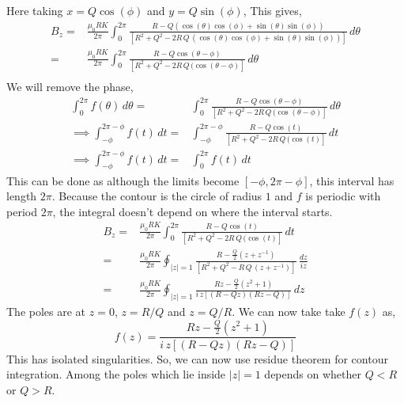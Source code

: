 \documentclass{article}
\begin{document}
Here taking $x=Q\cos(\phi)$ and $y = Q\sin(\phi)$, This gives,
\begin{equation*}
    \begin{split}
        B_z =& \frac{\mu_0 R K}{2\pi}\int_0^{2\pi}\frac{R-Q(\cos(\theta)\cos(\phi)+\sin(\theta)\sin(\phi))}{[R^2+Q^2-2R\, Q\, (\cos(\theta)\cos(\phi)+\sin(\theta)\sin(\phi))]}\, d\theta\\
        =& \frac{\mu_0 R K}{2\pi}\int_0^{2\pi}\frac{R-Q\cos(\theta-\phi)}{[R^2+Q^2-2R\, Q\, (\cos(\theta-\phi)]}\, d\theta\\
    \end{split}
\end{equation*}
We will remove the phase,
\begin{equation*}
    \begin{split}
        \int_{0}^{2\pi}f(\theta)\, d\theta =&\int_{0}^{2\pi}\frac{R-Q\cos(\theta-\phi)}{[R^2+Q^2-2R\, Q\, (\cos(\theta-\phi)]}\, d\theta\\
        \implies \int_{-\phi}^{2\pi-\phi}f(t)\, dt =& \int_{-\phi}^{2\pi-\phi}\frac{R-Q\cos(t)}{[R^2+Q^2-2R\, Q\, (\cos(t)]} \, dt\\
        \implies \int_{-\phi}^{2\pi-\phi}f(t)\, dt =& \int_{0}^{2\pi}f(t)\, dt
    \end{split}
\end{equation*}
This can be done as although the limits become $[-\phi, 2\pi-\phi]$, this interval has length $2\pi$. Because the contour is the circle of radius $1$ and $f$ is periodic with period $2\pi$, the integral doesn't depend on where the interval starts.
\begin{equation*}
    \begin{split}
        B_z =& \frac{\mu_0RK}{2\pi}\int_{0}^{2\pi}\frac{R-Q\cos(t)}{[R^2+Q^2-2R\, Q\, (\cos(t)]} \, dt\\
        =& \frac{\mu_0RK}{2\pi}\oint_{|z|=1}\frac{R-\frac{Q}{2}(z+z^{-1})}{[R^2+Q^2-R\, Q\, (z+z^{-1})]} \, \frac{dz}{i z}\\
        =& \frac{\mu_0RK}{2\pi}\oint_{|z|=1}\frac{Rz-\frac{Q}{2}(z^2+1)}{i\,z[(R-Qz)(Rz-Q)]} \, dz
    \end{split}
\end{equation*}
The poles are at $z=0$, $z=R/Q$ and $z=Q/R$. We can now take take $f(z)$ as,
\begin{equation*}
    f(z) = \frac{Rz-\frac{Q}{2}(z^2+1)}{i\,z[(R-Qz)(Rz-Q)]}
\end{equation*}
This has isolated singularities. So, we can now use residue theorem for contour integration.  Among the poles which lie inside $|z|=1$ depends on whether $Q<R$ or $Q>R$.
\end{document}
